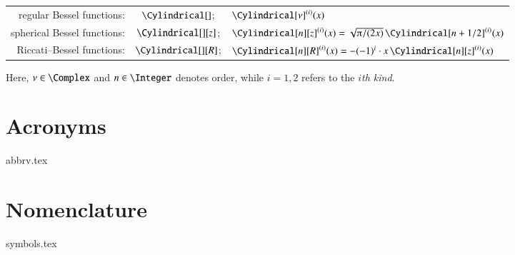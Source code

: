 \begin{tabular*}{\linewidth}{r c l}
    regular Bessel functions: & $\Cylindrical[]$; & $\Cylindrical[\nu]^{(i)}(x)$  \\
    spherical Bessel functions: & $\Cylindrical[][z]$; &  $\Cylindrical[n][z]^{(i)}(x) = \sqrt{\ppi/(2x)} \,\Cylindrical[n+1/2]^{(i)}(x) $ \\
    Riccati--Bessel functions: & $\Cylindrical[][R]$; &  $\Cylindrical[n][R]^{(i)}(x) =-(-1)^{i}\cdot x\,\Cylindrical[n][z]^{(i)}(x) $ 
\end{tabular*}
Here, $\nu\in \Complex$ and $n\in\Integer$ denotes order, while $i=1,2$ refers to the \emph{$i$th kind}. 


\section*{Acronyms}
{abbrv.tex}

\section*{Nomenclature}
{symbols.tex}
